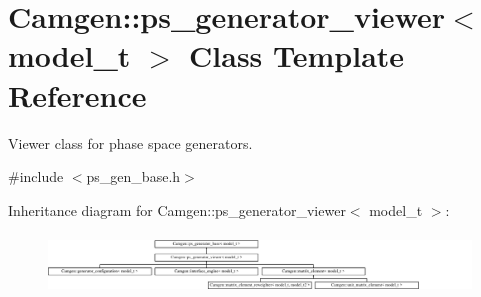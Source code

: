 \hypertarget{a00444}{\section{Camgen\-:\-:ps\-\_\-generator\-\_\-viewer$<$ model\-\_\-t $>$ Class Template Reference}
\label{a00444}
}


Viewer class for phase space generators.  




{\ttfamily \#include $<$ps\-\_\-gen\-\_\-base.\-h$>$}

Inheritance diagram for Camgen\-:\-:ps\-\_\-generator\-\_\-viewer$<$ model\-\_\-t $>$\-:\begin{figure}[H]
\begin{center}
\leavevmode
\includegraphics[height=1.609195cm]{a00444}
\end{center}
\end{figure}
